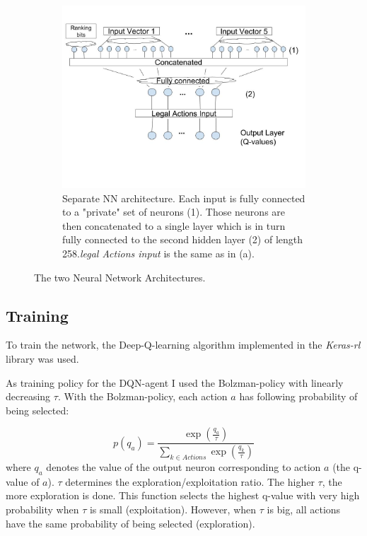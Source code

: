 \begin{figure}[hb]
\begin{center}
        \begin{subfigure}[h]{.8\textwidth}\includegraphics[width=\textwidth]{images/nnarchi_seperate}
            \caption{Separate NN architecture. Each input is fully connected to a "private" set of neurons (1). Those neurons are then concatenated to a single layer which is in turn fully connected to the second hidden layer (2) of length 258.\textit{legal Actions input} is the same as in (a). }
            \label{fig:archiw}
        \end{subfigure}
    \end{center}
\caption[Neural Network Architectures]{The two Neural Network Architectures.}
\label{fig:nnarchi}

\end{figure}

\subsection{Training}
To train the network, the Deep-Q-learning algorithm implemented in the \textit{Keras-rl} library\cite{kerasrl} was used.

As training policy for the DQN-agent I used the Bolzman-policy with linearly decreasing $\tau$.
With the Bolzman-policy, each action $a$ has following  probability of being selected:

$$
p(q_a) = \frac{\exp(\frac{q_a}{\tau})}{\sum_{k \in Actions} \exp(\frac{q_k}{\tau})}
$$
where $q_a$ denotes the value of the output neuron corresponding to action $a$ (the q-value of $a$).
$\tau$ determines the exploration/exploitation ratio. The higher $\tau$, the more exploration is done.\newline
This function selects the highest q-value with very high probability when $\tau$ is small (exploitation). However, when $\tau$ is big, all actions have the same probability of being selected (exploration).

